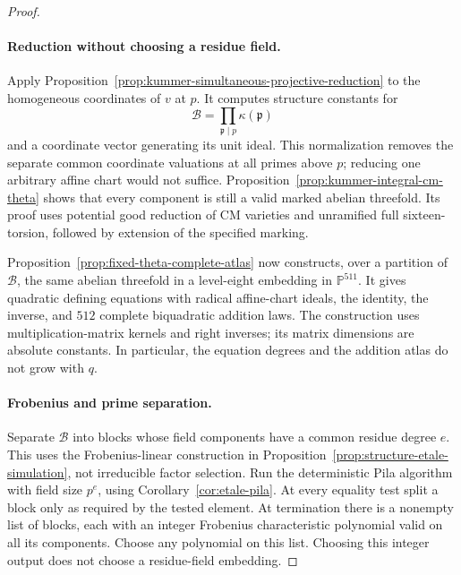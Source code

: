 \documentclass[11pt]{article}
\theoremstyle{definition}
\theoremstyle{remark}
\begin{document}
\begin{proof}
\paragraph{Reduction without choosing a residue field.}
Apply Proposition~\ref{prop:kummer-simultaneous-projective-reduction}
to the homogeneous coordinates of \(v\) at \(p\). It computes
structure constants for
\[
 \mathcal B=\prod_{\mathfrak p\mid p}\kappa(\mathfrak p)
\]
and a coordinate vector generating its unit ideal. This
normalization removes the separate common coordinate valuations
at all primes above \(p\); reducing one arbitrary affine chart
would not suffice. Proposition~\ref{prop:kummer-integral-cm-theta}
shows that every component is still a valid marked abelian
threefold. Its proof uses potential good reduction of CM
varieties and unramified full sixteen-torsion, followed by
extension of the specified marking.

Proposition~\ref{prop:fixed-theta-complete-atlas} now constructs,
over a partition of \(\mathcal B\), the same abelian threefold
in a level-eight embedding in \(\mathbb P^{511}\). It gives
quadratic defining equations with radical affine-chart ideals,
the identity, the inverse, and \(512\) complete biquadratic
addition laws. The construction uses multiplication-matrix
kernels and right inverses; its matrix dimensions are absolute
constants. In particular, the equation degrees and the addition
atlas do not grow with \(q\).

\paragraph{Frobenius and prime separation.}
Separate \(\mathcal B\) into blocks whose field components have
a common residue degree \(e\). This uses the Frobenius-linear
construction in Proposition~\ref{prop:structure-etale-simulation},
not irreducible factor selection. Run the deterministic Pila
algorithm with field size \(p^e\), using
Corollary~\ref{cor:etale-pila}. At every equality test split a
block only as required by the tested element. At termination
there is a nonempty list of blocks, each with an integer
Frobenius characteristic polynomial valid on all its components.
Choose any polynomial on this list. Choosing this integer
output does not choose a residue-field embedding.


\end{proof}
\end{document}
